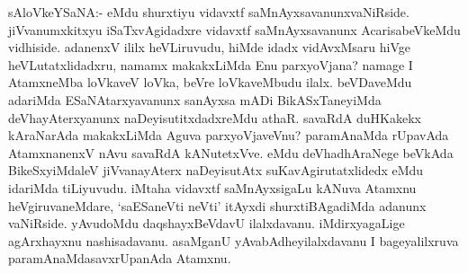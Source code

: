 
\begin{artha}
sAloVkeYSaNA:- eMdu shurxtiyu vidavxtf saMnAyxsavanunx\break vaNiRside. jiVvanumxkitxyu iSaTxvAgidadxre vidavxtf saMnAyxsavanunx AcarisabeVkeMdu vidhiside. adanenxV ililx heVLiruvudu, hiMde idadx vidAvxMsaru hiVge heVLutatxlidadxru, namamx makakxLiMda Enu parxyoVjana? namage I AtamxneMba loVkaveV loVka, beVre loVkaveMbudu ilalx. beVDaveMdu adariMda ESaNAtarxyavanunx sanAyxsa mADi BikASxTaneyiMda deVhayAterxyanunx naDeyisutitxdadxreMdu athaR. savaRdA duHKakekx kAraNarAda makakxLiMda Aguva parxyoVjaveVnu? paramAnaMda rUpavAda AtamxnanenxV nAvu savaRdA kANutetxVve. eMdu deVhadhAraNege beVkAda BikeSxyiMdaleV jiVvanayAterx naDeyisutAtx suKavAgirutatxlidedx eMdu idariMda tiLiyuvudu. iMtaha vidavxtf saMnAyxsigaLu kANuva Atamxnu heVgiruvaneMdare, `saESaneVti neVti' itAyxdi shurxtiBAgadiMda adanunx vaNiRside. yAvudoMdu daqshayxBeVdavU ilalxdavanu. iMdirxyagaLige agArxhayxnu nashisadavanu. asaMganU yAvabAdheyilalxdavanu I bageyalilxruva paramAnaMdasavxrUpanAda Atamxnu.
\end{artha}


